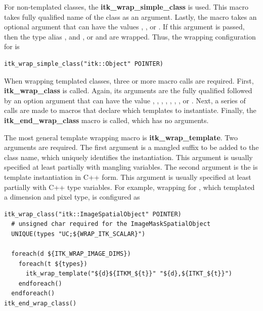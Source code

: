 For non-templated classes, the \textbf{itk\_wrap\_simple\_class} is used. This
macro takes fully qualified name of the class as an argument. Lastly, the
macro takes an optional argument that can have the values ,
, or . If
this argument is passed, then the type alias ,
 and , or
 and  are
wrapped. Thus, the wrapping configuration for  is

\begin{verbatim}
itk_wrap_simple_class("itk::Object" POINTER)
\end{verbatim}

When wrapping templated classes, three or more macro calls are required.
First, \textbf{itk\_wrap\_class} is called.  Again, its arguments are the
fully qualified followed by an option argument that can have the value
, ,
, ,
,
, , or
. Next, a series of calls are made to macros that declare
which templates to instantiate. Finally, the \textbf{itk\_end\_wrap\_class}
macro is called, which has no arguments.

The most general template wrapping macro is \textbf{itk\_wrap\_template}. Two
arguments are required. The first argument is a mangled suffix to be added to
the class name, which uniquely identifies the instantiation. This argument is usually
specified at least partially with  mangling
variables. The second argument is the is template instantiation in C++ form.
This argument is usually specified at least partially with 
C++ type variables. For example, wrapping for
, which templated a dimension and pixel type, is
configured as

\begin{verbatim}
itk_wrap_class("itk::ImageSpatialObject" POINTER)
  # unsigned char required for the ImageMaskSpatialObject
  UNIQUE(types "UC;${WRAP_ITK_SCALAR}")

  foreach(d ${ITK_WRAP_IMAGE_DIMS})
    foreach(t ${types})
      itk_wrap_template("${d}${ITKM_${t}}" "${d},${ITKT_${t}}")
    endforeach()
  endforeach()
itk_end_wrap_class()
\end{verbatim}


